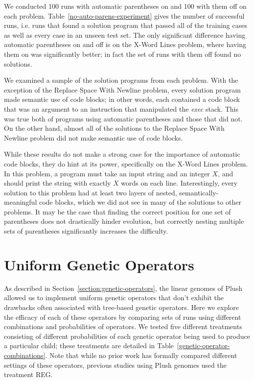 We conducted 100 runs with automatic parentheses on and 100 with them off on each problem. Table~\ref{no-auto-parens-experiment} gives the number of successful runs, i.e. runs that found a solution program that passed all of the training cases as well as every case in an unseen test set. The only significant difference having automatic parentheses on and off is on the X-Word Lines problem, where having them on was significantly better; in fact the set of runs with them off found no solutions.

We examined a sample of the solution programs from each problem. With the exception of the Replace Space With Newline problem, every solution program made semantic use of code blocks; in other words, each contained a code block that was an argument to an instruction that manipulated the \textit{exec} stack. This was true both of programs using automatic parentheses and those that did not. On the other hand, almost all of the solutions to the Replace Space With Newline problem did not make semantic use of code blocks.

While these results do not make a strong case for the importance of automatic code blocks, they do hint at its power, specifically on the X-Word Lines problem. In this problem, a program must take an input string and an integer $X$, and should print the string with exactly $X$ words on each line. Interestingly, every solution to this problem had at least two layers of nested, semantically-meaningful code blocks, which we did not see in many of the solutions to other problems. It may be the case that finding the correct position for one set of parentheses does not drastically hinder evolution, but correctly nesting multiple sets of parentheses significantly increases the difficulty.


\section{Uniform Genetic Operators}

As described in Section~\ref{section:genetic-operators}, the linear genomes of Plush allowed us to implement uniform genetic operators that don't exhibit the 
drawbacks often associated with tree-based genetic operators. Here we explore the efficacy of each of these operators by comparing sets of runs using different combinations and probabilities of operators. We tested five different treatments consisting of different probabilities of each genetic operator being used to produce a particular child; these treatments are detailed in Table~\ref{genetic-operator-combinations}. Note that while no prior work has formally compared different settings of these operators, previous studies using Plush genomes \citep{Helmuth:2015:GECCO, Helmuth:2015:GPTP, McPhee:2015:GPTP} used the treatment REG.

